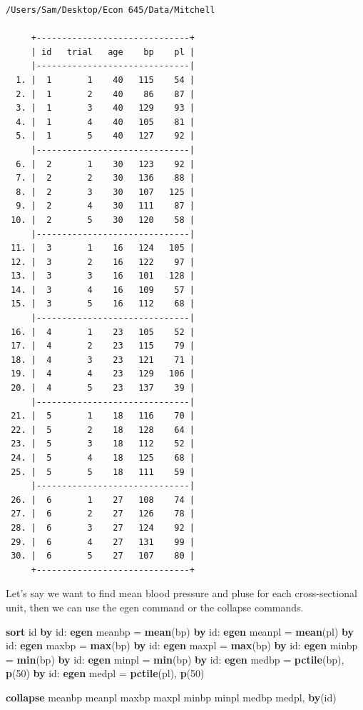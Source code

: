 \documentclass[
]{book}
\newenvironment{Shaded}{\begin{snugshade}}{\end{snugshade}}
\newcommand{\FunctionTok}[1]{\textcolor[rgb]{0.13,0.29,0.53}{\textbf{#1}}}
\newcommand{\KeywordTok}[1]{\textcolor[rgb]{0.13,0.29,0.53}{\textbf{#1}}}
\newcommand{\NormalTok}[1]{#1}
\begin{document}
\begin{verbatim}
/Users/Sam/Desktop/Econ 645/Data/Mitchell

     +------------------------------+
     | id   trial   age    bp    pl |
     |------------------------------|
  1. |  1       1    40   115    54 |
  2. |  1       2    40    86    87 |
  3. |  1       3    40   129    93 |
  4. |  1       4    40   105    81 |
  5. |  1       5    40   127    92 |
     |------------------------------|
  6. |  2       1    30   123    92 |
  7. |  2       2    30   136    88 |
  8. |  2       3    30   107   125 |
  9. |  2       4    30   111    87 |
 10. |  2       5    30   120    58 |
     |------------------------------|
 11. |  3       1    16   124   105 |
 12. |  3       2    16   122    97 |
 13. |  3       3    16   101   128 |
 14. |  3       4    16   109    57 |
 15. |  3       5    16   112    68 |
     |------------------------------|
 16. |  4       1    23   105    52 |
 17. |  4       2    23   115    79 |
 18. |  4       3    23   121    71 |
 19. |  4       4    23   129   106 |
 20. |  4       5    23   137    39 |
     |------------------------------|
 21. |  5       1    18   116    70 |
 22. |  5       2    18   128    64 |
 23. |  5       3    18   112    52 |
 24. |  5       4    18   125    68 |
 25. |  5       5    18   111    59 |
     |------------------------------|
 26. |  6       1    27   108    74 |
 27. |  6       2    27   126    78 |
 28. |  6       3    27   124    92 |
 29. |  6       4    27   131    99 |
 30. |  6       5    27   107    80 |
     +------------------------------+
\end{verbatim}

Let's say we want to find mean blood pressure and pluse for each cross-sectional unit, then we can use the egen command or the collapse commands.

\begin{Shaded}
\begin{Highlighting}[]
\KeywordTok{sort}\NormalTok{ id}
\KeywordTok{by}\NormalTok{ id: }\KeywordTok{egen}\NormalTok{ meanbp = }\KeywordTok{mean}\NormalTok{(bp)}
\KeywordTok{by}\NormalTok{ id: }\KeywordTok{egen}\NormalTok{ meanpl = }\KeywordTok{mean}\NormalTok{(pl)}
\KeywordTok{by}\NormalTok{ id: }\KeywordTok{egen}\NormalTok{ maxbp = }\FunctionTok{max}\NormalTok{(bp)}
\KeywordTok{by}\NormalTok{ id: }\KeywordTok{egen}\NormalTok{ maxpl = }\FunctionTok{max}\NormalTok{(bp)}
\KeywordTok{by}\NormalTok{ id: }\KeywordTok{egen}\NormalTok{ minbp = }\FunctionTok{min}\NormalTok{(bp)}
\KeywordTok{by}\NormalTok{ id: }\KeywordTok{egen}\NormalTok{ minpl = }\FunctionTok{min}\NormalTok{(bp)}
\KeywordTok{by}\NormalTok{ id: }\KeywordTok{egen}\NormalTok{ medbp = }\KeywordTok{pctile}\NormalTok{(bp), }\KeywordTok{p}\NormalTok{(50)}
\KeywordTok{by}\NormalTok{ id: }\KeywordTok{egen}\NormalTok{ medpl = }\KeywordTok{pctile}\NormalTok{(pl), }\KeywordTok{p}\NormalTok{(50)}

\KeywordTok{collapse}\NormalTok{ meanbp meanpl maxbp maxpl minbp minpl medbp medpl, }\KeywordTok{by}\NormalTok{(id)}
\end{Highlighting}
\end{Shaded}
\end{document}

